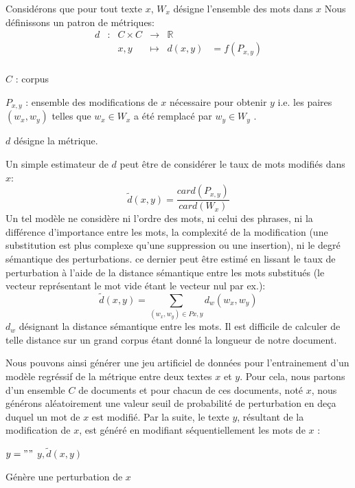Considérons que pour tout texte $x$, $W_x$ désigne l'ensemble des mots dans $x$
Nous définissons un patron de métriques:
\begin{equation}
\begin{array}{cccccc}
d & : & C \times C & \to & \mathbb{R} & \\
 & & x, y & \mapsto & d(x, y) & = f(P_{x,y}) \\
\end{array}
\end{equation}

$C$ : corpus

$P_{x,y}$ : ensemble des modifications de $x$ nécessaire pour obtenir $y$ i.e. les paires $(w_x, w_y)$ telles que $w_x \in W_x$ a été remplacé par $w_y \in W_y$  .

$d$ désigne la métrique.

Un simple estimateur de $d$ peut être de considérer le taux de mots modifiés dans $x$: 
\begin{equation}
\widetilde{d}(x,y) = \frac{card(P_{x,y})}{card(W_x)}
\end{equation}
 Un tel modèle ne considère ni l'ordre des mots, ni celui des phrases, ni la différence d'importance entre les mots, la complexité de la modification (une substitution est plus complexe qu'une suppression ou une insertion), ni le degré sémantique des perturbations. ce dernier peut être estimé en lissant le taux de perturbation à l'aide de la distance sémantique entre les mots substitués (le vecteur représentant le mot vide étant le vecteur nul par ex.):
\begin{equation}
\widetilde{d}(x,y) = \sum\limits_{(w_x, w_y) \in Px,y} d_w(w_x,w_y) \label{equation:similarite:somme-dist-mots}
\end{equation}
$d_w$ désignant la distance sémantique entre les mots.
Il est difficile de calculer de telle distance sur un grand corpus étant donné la longueur de notre document.

Nous pouvons ainsi générer une jeu artificiel de données pour l'entrainement d'un modèle regréssif de la métrique entre deux textes $x$ et $y$. Pour cela, nous partons d'un ensemble $C$ de documents et pour chacun de ces documents, noté $x$, nous générons aléatoirement une valeur seuil de probabilité de perturbation en deça duquel un mot de $x$ est modifié. Par la suite, le texte  $y$, résultant de la modification de $x$, est généré en modifiant séquentiellement les mots de $x$ :

\begin{algorithm}[H]
 $y = "" $\; 
 \Return $y, \widetilde{d}(x,y)$\;
 \caption{Génère une perturbation de $x$} \label{algo:similarite:perturbation}
\end{algorithm}


